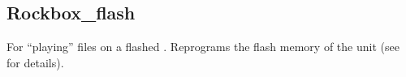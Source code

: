 \subsection{Rockbox\_flash}
For ``playing''  files on a flashed \dap. Reprograms the flash 
memory of the \dap{} unit (see  for details).


